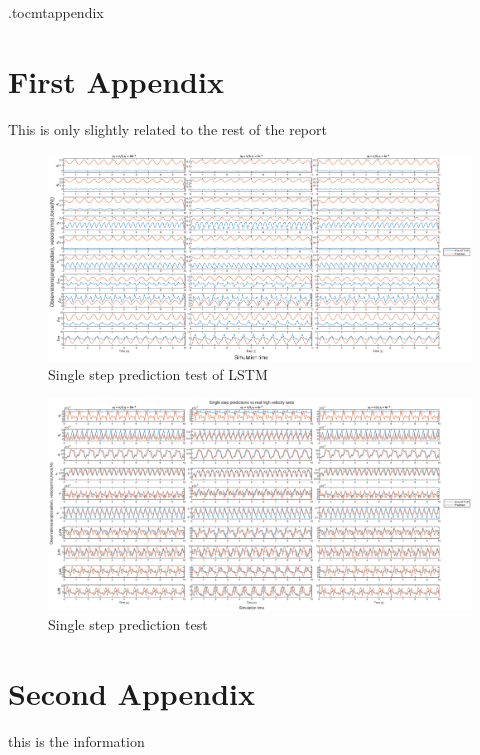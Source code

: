 \newpage
\appendix
\newpage

\etocdepthtag.toc{mtappendix}
\tableofcontents
\pagestyle{plain}
\newpage
{}

\chapter{First Appendix}
This is only slightly related to the rest of the report
\begin{figure}[ht]
    \centering
    \includegraphics[width=\linewidth]{img/AppA/lstm_pred.eps}
    \caption{Single step prediction test of LSTM}
    \label{fig:lstm_test}
\end{figure}

\begin{figure}[ht]
    \centering
    \includegraphics[width=\linewidth]{img/AppA/model_all.eps}
    \caption{Single step prediction test}
    \label{fig:DNN_test}
\end{figure}


\chapter{Second Appendix}
this is the information

